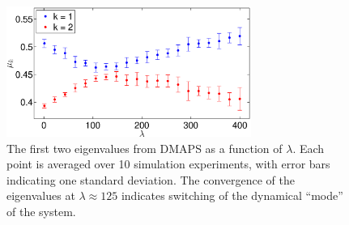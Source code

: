 \documentclass[prl, reprint, final, showkeys]{revtex4-1}
\begin{document}





\begin{figure}[t] 
\includegraphics[width=8cm]{detect_change_eigenvalues}
\caption{The first two eigenvalues from DMAPS as a function of $\lambda$. Each point is averaged over 10 simulation experiments, with error bars indicating one standard deviation. 
The convergence of the eigenvalues at $\lambda \approx 125$ indicates switching of the dynamical ``mode'' of the system.}
\label{fig:detect_change}
\end{figure}
\end{document}
